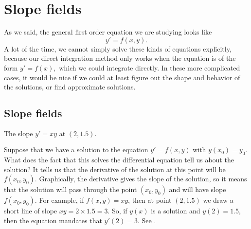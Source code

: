 \sectionnewpage
\section{Slope fields}
\label{slopefields:section}




%

As we said, the general first order equation we are studying looks like
\begin{equation*}
y' = f(x,y).
\end{equation*}
A lot of the time, we cannot simply solve these kinds of equations explicitly, because our direct integration method only works when the equation is of the form $y' = f(x),$ which we could integrate directly. In these more complicated cases, it would be nice if we could at least figure out the shape and behavior of
the solutions, or find approximate solutions.

\subsection{Slope fields}

\begin{mywrapfig}{2.75in}
\capstart
{}
\caption{The slope $y'=xy$ at $(2,1.5)$.\label{1.3:fig0}}
\end{mywrapfig}

Suppose that we have a solution to the equation $y' = f(x,y)$ with $y(x_0) = y_0$. 
What does the fact that this solves the differential equation tell us about the solution?
 It tells us that the derivative of the solution at this point will be 
$f(x_0, y_0)$. Graphically, the derivative gives the slope of the solution,
 so it means that the solution will pass through the point $(x_0, y_0)$ and will have slope $f(x_0, y_0)$. 
For example, if $f(x,y) = xy$, then at point $(2,1.5)$ we draw a
short line of slope $xy = 2 \times 1.5 = 3$.  So, if $y(x)$ is a solution
and $y(2) = 1.5$, then the equation mandates that $y'(2) = 3$.
See .

